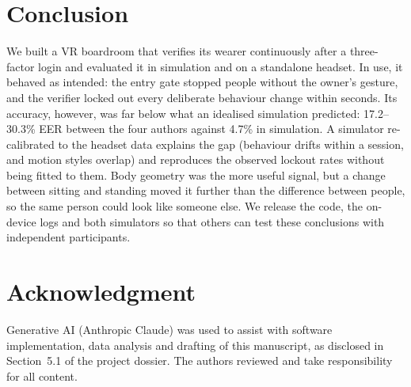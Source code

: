 \section{Conclusion}
We built a VR boardroom that verifies its wearer continuously after a three-factor login and evaluated it in simulation and on a standalone headset. In use, it behaved as intended: the entry gate stopped people without the owner's gesture, and the verifier locked out every deliberate behaviour change within seconds. Its accuracy, however, was far below what an idealised simulation predicted: 17.2--30.3\% EER between the four authors against 4.7\% in simulation. A simulator re-calibrated to the headset data explains the gap (behaviour drifts within a session, and motion styles overlap) and reproduces the observed lockout rates without being fitted to them. Body geometry was the more useful signal, but a change between sitting and standing moved it further than the difference between people, so the same person could look like someone else. We release the code, the on-device logs and both simulators so that others can test these conclusions with independent participants.

\section*{Acknowledgment}
Generative AI (Anthropic Claude) was used to assist with software implementation, data analysis and drafting of this manuscript, as disclosed in Section~5.1 of the project dossier. The authors reviewed and take responsibility for all content.

